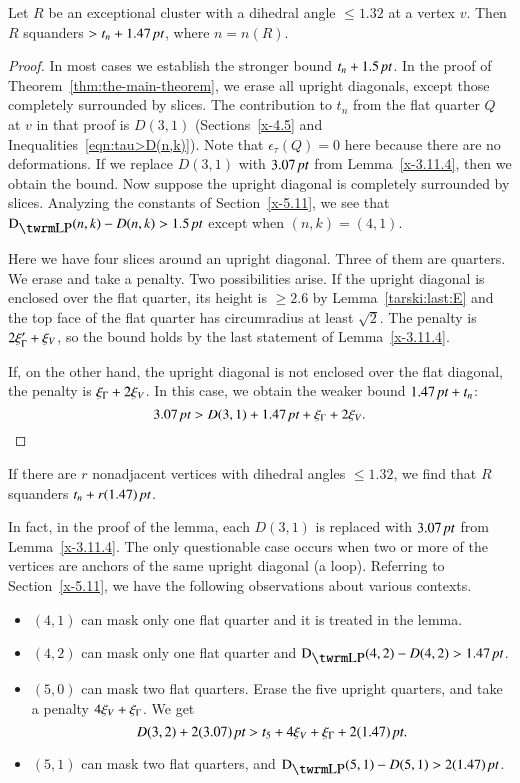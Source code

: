 \begin{lemma}
Let $R$ be an exceptional cluster with a dihedral angle
$\le1.32$ at a vertex $v$. Then $R$ squanders $>t_n+1.47\,\hbox{\it pt}$, where
$n=n(R)$.
\end{lemma}

\begin{proof}
In most cases we establish the stronger bound $t_n+1.5\,\hbox{\it pt}$. In the
proof of Theorem~\ref{thm:the-main-theorem}, we erase all upright
diagonals, except those completely surrounded by slices. The
contribution to $t_n$ from the flat quarter $Q$ at $v$ in that proof is
$D(3,1)$ (Sections~\ref{x-4.5} and Inequalities~\ref{eqn:tau>D(n,k)}).
Note that $\epsilon_\tau(Q)=0$ here because there are no deformations.
If we replace $D(3,1)$ with $3.07\,\hbox{\it pt}$ from Lemma~\ref{x-3.11.4}, then
we obtain the bound. Now suppose the upright diagonal is completely
surrounded by slices. Analyzing the constants of
Section~\ref{x-5.11}, we see that $\DLP(n,k)-D(n,k)>1.5\,\pt$ except
when $(n,k)=(4,1)$.

Here we have four slices around an upright diagonal. Three
of them are quarters.  We erase and take a penalty. Two possibilities
arise.  If the upright diagonal is enclosed over the flat quarter, its
height is $\ge2.6$ by Lemma~\ref{tarski:last:E} and the top face of the
flat quarter has circumradius at least $\sqrt2$.  The penalty is
$2\xi_\Gamma'+\xi_V$, so the bound holds by the last statement of
Lemma~\ref{x-3.11.4}.

If, on the other hand, the upright diagonal is not enclosed over the
flat diagonal, the penalty is $\xi_\Gamma+2\xi_V$.  In this case, we obtain the
weaker bound $1.47\,\hbox{\it pt}+t_n$:
    $$3.07\,\hbox{\it pt} > D(3,1) + 1.47\,\hbox{\it pt} +\xi_\Gamma+2\xi_V.$$
\end{proof}

\begin{remark} \label{remark:1.47}
If there are $r$ nonadjacent vertices with dihedral angles
$\le1.32$, we find that $R$ squanders $t_n+r(1.47)\,\hbox{\it pt}$.
\end{remark}

In fact, in the proof of the lemma, each $D(3,1)$ is replaced with
$3.07\,\hbox{\it pt}$ from Lemma~\ref{x-3.11.4}.  The only questionable case
occurs when two or more of the vertices are anchors of the same upright
diagonal (a loop). Referring to Section~\ref{x-5.11}, we have the
following observations about various contexts.

\begin{itemize}
    \item $(4,1)$ can mask only one flat quarter and it is treated in the
lemma.
    \item $(4,2)$ can mask only one flat quarter and
    $\DLP(4,2)-D(4,2)>1.47\,\pt$.
    \item $(5,0)$ can mask two flat quarters.  Erase the five upright quarters,
        and take a penalty $4\xi_V+\xi_\Gamma$.  We get
    $$D(3,2)+2(3.07)\,\hbox{\it pt} > t_5+4\xi_V+\xi_\Gamma+2(1.47)\,\hbox{\it pt}.$$
    \item $(5,1)$ can mask two flat quarters, and $\DLP(5,1)-D(5,1)>2(1.47)\,\pt$.
\end{itemize}




